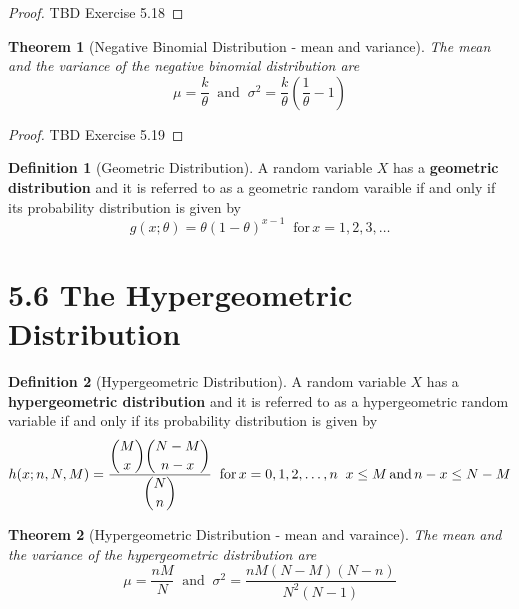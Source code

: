 \documentclass[
10pt,reqno
]{amsart}
\newtheorem{theorem}{Theorem}[section]
\theoremstyle{definition}
\newtheorem{definition}{Definition}[section]
\begin{document}
\begin{proof}
TBD Exercise 5.18
\end{proof}

\begin{theorem}[Negative Binomial Distribution - mean and variance]
The mean and the variance of the negative binomial distribution are
\[
\mu = \frac{k}{\theta} \;\; \text{and} \;\; \sigma^2=\frac{k}{\theta} \left ( \frac{1}{\theta}-1 \right )
\]
\end{theorem}
\begin{proof}
TBD Exercise 5.19
\end{proof}

\begin{definition}[Geometric Distribution]
A random variable \(X\) has a \textbf{geometric distribution} and it is referred to as a geometric random varaible if and only if its probability distribution is given by
\[
g(x;\theta)=\theta(1-\theta)^{x-1} \;\; \text{for} \, x=1,2,3,\dots
\]
\end{definition}

\section*{5.6 The Hypergeometric Distribution}

\begin{definition}[Hypergeometric Distribution]
A random variable \(X\) has a \textbf{hypergeometric distribution} and it is referred to as a hypergeometric random variable if and only if its probability distribution is given by
\[
h(x;n,N,M)=\frac{\dbinom M x \dbinom {N-M}{n-x}}{\dbinom N n} \;\; {\text{for} \, x=0,1,2,\dots,n} \;\; x \le M \, \text{and} \, n-x \le N-M
\]
\end{definition}

\begin{theorem}[Hypergeometric Distribution - mean and varaince]
The mean and the variance of the hypergeometric distribution are
\[
\mu = \frac{nM}{N} \;\; \text{and} \;\; \sigma^2=\frac{nM(N-M)(N-n)}{N^2(N-1)}
\]
\end{theorem}
\end{document}
